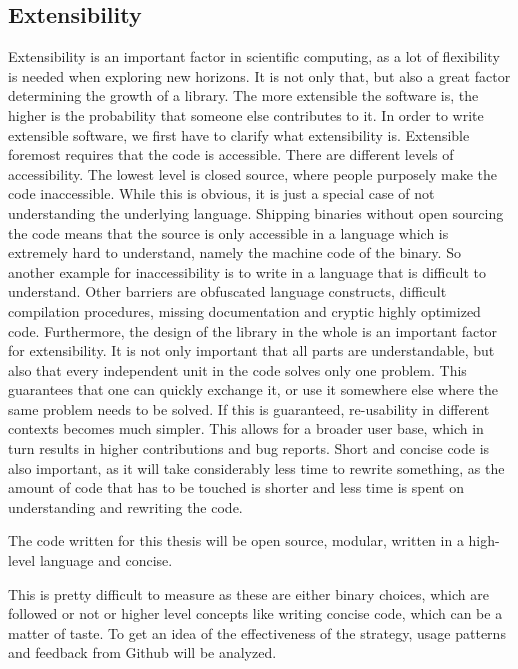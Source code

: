 \subsection{Extensibility}
Extensibility is an important factor in scientific computing, as a lot of flexibility is needed when exploring new horizons. 
It is not only that, but also a great factor determining the growth of a library. The more extensible the software is, the higher is the probability that someone else contributes to it.
In order to write extensible software, we first have to clarify what extensibility is.
Extensible foremost requires that the code is accessible. There are different levels of accessibility. 
The lowest level is closed source, where people purposely make the code inaccessible. While this is obvious, it is just a special case of not understanding the underlying language. 
Shipping binaries without open sourcing the code means that the source is only accessible in a language which is extremely hard to understand, namely the machine code of the binary. So another example for inaccessibility is to write in a language that is difficult to understand. 
Other barriers are obfuscated language constructs, difficult compilation procedures, missing documentation and cryptic highly optimized code.
Furthermore, the design of the library in the whole is an important factor for extensibility. It is not only important that all parts are understandable, but also that every independent unit in the code solves only one problem. 
This guarantees that one can quickly exchange it, or use it somewhere else where the same problem needs to be solved.
If this is guaranteed, re-usability in different contexts becomes much simpler. 
This allows for a broader user base, which in turn results in higher contributions and bug reports.
Short and concise code is also important, as it will take considerably less time to rewrite something, as the amount of code that has to be touched is shorter and less time is spent on understanding and rewriting the code.

The code written for this thesis will be open source, modular, written in a high-level language and concise.

This is pretty difficult to measure as these are either binary choices, which are followed or not or higher level concepts like writing concise code, which can be a matter of taste.
To get an idea of the effectiveness of the strategy, usage patterns and feedback from Github will be analyzed.

